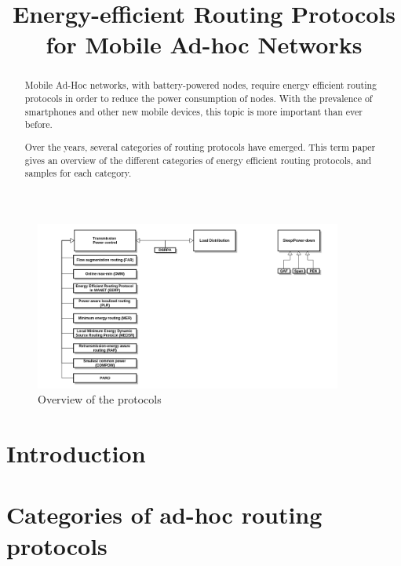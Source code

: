 \documentclass[conference]{IEEEtran}
\begin{document}
\title{Energy-efficient Routing Protocols for Mobile Ad-hoc Networks}
\author{
}

\maketitle



\begin{abstract}
Mobile Ad-Hoc networks, with battery-powered nodes, require energy efficient
routing protocols in order to reduce the power consumption of nodes. With the
prevalence of smartphones and other new mobile devices, this topic is more
important than ever before.

Over the years, several categories of routing protocols have emerged.
This term paper gives an overview of the different categories of energy
efficient routing protocols, and samples for each category.
\end{abstract}
\begin{figure}
  \includegraphics[width=0.9\textwidth]{images/overview}
  \caption{Overview of the protocols}
  \label{fig:overview}
\end{figure}

\section{Introduction}


\section{Categories of ad-hoc routing protocols}\label{categories}

\end{document}
